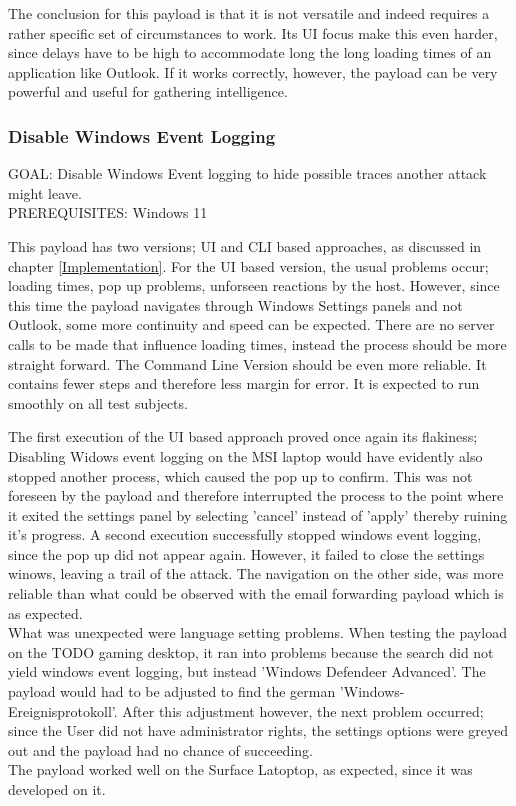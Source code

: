 The conclusion for this payload is that it is not versatile and indeed requires a rather specific set of circumstances to work. Its UI focus make this even harder, since delays have to be high to accommodate long the long loading times of an application like Outlook. If it works correctly, however, the payload can be very powerful and useful for gathering intelligence. 


\subsubsection{Disable Windows Event Logging}

GOAL: Disable Windows Event logging to hide possible traces another attack might leave. \\
PREREQUISITES: Windows 11

This payload has two versions; UI and CLI based approaches, as discussed in chapter \ref{Implementation}. For the UI based version, the usual problems occur; loading times, pop up problems, unforseen reactions by the host. However, since this time the payload navigates through Windows Settings panels and not Outlook, some more continuity and speed can be expected. There are no server calls to be made that influence loading times, instead the process should be more straight forward. 
The Command Line Version should be even more reliable. It contains fewer steps and therefore less margin for error. It is expected to run smoothly on all test subjects.

The first execution of the UI based approach proved once again its flakiness; Disabling Widows event logging on the MSI laptop would have evidently also stopped another process, which caused the pop up to confirm. This was not foreseen by the payload and therefore interrupted the process to the point where it exited the settings panel by selecting 'cancel' instead of 'apply' thereby ruining it's progress. A second execution successfully stopped windows event logging, since the pop up did not appear again. However, it failed to close the settings winows, leaving a trail of the attack. The navigation on the other side, was more reliable than what could be observed with the email forwarding payload which is as expected. \\
What was unexpected were language setting problems. When testing the payload on the TODO gaming desktop, it ran into problems because the search did not yield windows event logging, but instead 'Windows Defendeer Advanced'. The payload would had to be adjusted to find the german 'Windows-Ereignisprotokoll'. After this adjustment however, the next problem occurred; since the User did not have administrator rights, the settings options were greyed out and the payload had no chance of succeeding. \\
The payload worked well on the Surface Latoptop, as expected, since it was developed on it.

